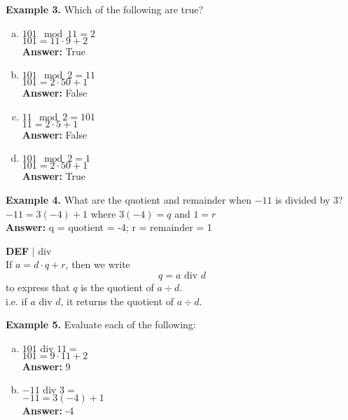 \documentclass [12pt]{article}
\begin{document}
\raggedright
\textbf{Example 3.} Which of the following are true?
\begin{enumerate}[(a)]
\item $101 \mod 11 = 2$\\
\quad $101 = 11\cdot 9 + 2$\\
\quad \textbf{Answer:} True
\item $101 \mod 2 = 11$\\
\quad $101 = 2\cdot 50 + 1$\\
\quad \textbf{Answer:} False
\item $11 \mod 2 = 101$\\
\quad $11 = 2\cdot 5 + 1$\\
\quad \textbf{Answer:} False
\item $101 \mod 2 = 1$\\
\quad $101 = 2\cdot 50 + 1$\\
\quad \textbf{Answer:} True
\end{enumerate}
\vspace{0.1in}
\raggedright
\textbf{Example 4.} What are the quotient and remainder when $-11$ is divided by 3?\\
\quad $-11 = 3(-4) + 1$ where $3(-4) = q$ and $1 = r$\\
\quad\textbf{Answer:} q = quotient = -4; r = remainder = 1
\vspace{0.25in}

\begin{framed}
\textbf{DEF} $|$ div \\
\vspace{0.25cm}
If $a = d \cdot q + r $, then we write \[q = a \text{ div } d\] to express that $q$ is the quotient of $a \div
d$. \\
i.e. if $a$ div $d$, it returns the quotient of $a \div d$.
\end{framed}
\vspace{0.25cm}
\raggedright
\textbf{Example 5.} Evaluate each of the following:
\begin{enumerate}[(a)]
\item $101 \text{ div } 11 = $\\
\quad $101 = 9 \cdot 11 + 2$\\
\quad\textbf{Answer:} 9
\item $-11 \text{ div } 3 = $\\
\quad $-11 = 3( -4) + 1$\\
\quad\textbf{Answer:} -4
\end{enumerate}
\vspace{0.1cm}
\end{document}
